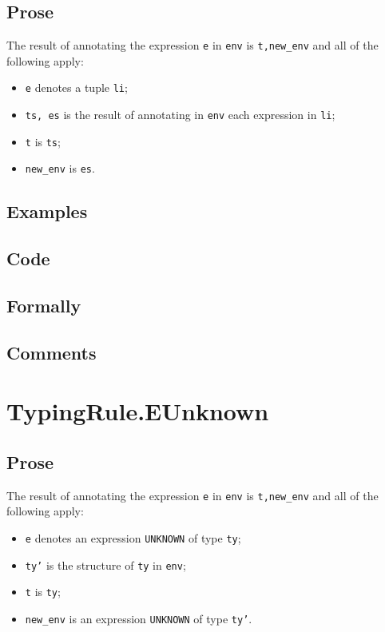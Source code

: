 \documentclass{book}
\begin{document}
  \subsection{Prose}
  The result of annotating the expression \texttt{e} in \texttt{env} is
\texttt{t,new\_env} and all of the following apply:
  \begin{itemize}
  \item \texttt{e} denotes a tuple \texttt{li};
  \item \texttt{ts, es} is the result of annotating in \texttt{env} each expression in \texttt{li};
  \item \texttt{t} is \texttt{ts};
  \item \texttt{new\_env} is \texttt{es}.
  \end{itemize}

  \subsection{Examples}

  \subsection{Code}

  \subsection{Formally}

  \subsection{Comments}

\section{TypingRule.EUnknown \label{sec:TypingRule.EUnknown}}

  \subsection{Prose}
  The result of annotating the expression \texttt{e} in \texttt{env} is
\texttt{t,new\_env} and all of the following apply:
  \begin{itemize}
  \item \texttt{e} denotes an expression \texttt{UNKNOWN} of type \texttt{ty};
  \item \texttt{ty'} is the structure of \texttt{ty} in \texttt{env};
  \item \texttt{t} is \texttt{ty};
  \item \texttt{new\_env} is an expression \texttt{UNKNOWN} of type \texttt{ty'}.
  \end{itemize}
\end{document}
